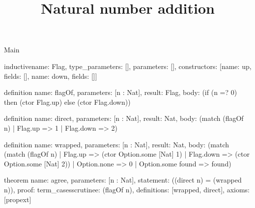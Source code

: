 \begin{lexlean}{Main}
\title{Natural number addition}
\begin{semanticmodule}
inductive{name: Flag, type_parameters: [], parameters: [], constructors: [{name: up, fields: []}, {name: down, fields: []}]}

definition{
  name: flagOf,
  parameters: [n : Nat],
  result: Flag,
  body: (if (n =? 0) then (ctor Flag.up) else (ctor Flag.down))
}

definition{
  name: direct,
  parameters: [n : Nat],
  result: Nat,
  body: (match (flagOf n)
    | Flag.up => 1
    | Flag.down => 2)
}

definition{
  name: wrapped,
  parameters: [n : Nat],
  result: Nat,
  body: (match (match (flagOf n)
    | Flag.up => (ctor Option.some [Nat] 1)
    | Flag.down => (ctor Option.some [Nat] 2))
    | Option.none => 0
    | Option.some found => found)
}

theorem{
  name: agree,
  parameters: [n : Nat],
  statement: ((direct n) = (wrapped n)),
  proof: term_cases{scrutinee: (flagOf n), definitions: [wrapped, direct]},
  axioms: [propext]
}
\end{semanticmodule}
\end{lexlean}
